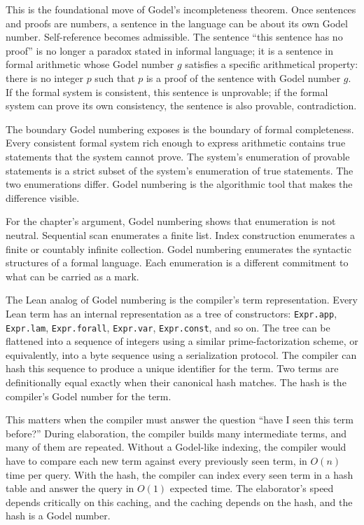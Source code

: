 This is the foundational move of Godel's incompleteness theorem. Once
sentences and proofs are numbers, a sentence in the language can be about its
own Godel number. Self-reference becomes admissible. The sentence ``this
sentence has no proof'' is no longer a paradox stated in informal language;
it is a sentence in formal arithmetic whose Godel number $g$ satisfies a
specific arithmetical property: there is no integer $p$ such that $p$ is a
proof of the sentence with Godel number $g$. If the formal system is
consistent, this sentence is unprovable; if the formal system can prove its
own consistency, the sentence is also provable, contradiction.

The boundary Godel numbering exposes is the boundary of formal completeness.
Every consistent formal system rich enough to express arithmetic contains
true statements that the system cannot prove. The system's enumeration of
provable statements is a strict subset of the system's enumeration of true
statements. The two enumerations differ. Godel numbering is the algorithmic
tool that makes the difference visible.

For the chapter's argument, Godel numbering shows that enumeration is not
neutral. Sequential scan enumerates a finite list. Index construction
enumerates a finite or countably infinite collection. Godel numbering
enumerates the syntactic structures of a formal language. Each enumeration
is a different commitment to what can be carried as a mark.

The Lean analog of Godel numbering is the compiler's term representation.
Every Lean term has an internal representation as a tree of constructors:
\texttt{Expr.app}, \texttt{Expr.lam}, \texttt{Expr.forall}, \texttt{Expr.var},
\texttt{Expr.const}, and so on. The tree can be flattened into a sequence of
integers using a similar prime-factorization scheme, or equivalently, into a
byte sequence using a serialization protocol. The compiler can hash this
sequence to produce a unique identifier for the term. Two terms are
definitionally equal exactly when their canonical hash matches. The hash is
the compiler's Godel number for the term.

This matters when the compiler must answer the question ``have I seen this
term before?'' During elaboration, the compiler builds many intermediate
terms, and many of them are repeated. Without a Godel-like indexing, the
compiler would have to compare each new term against every previously seen
term, in $O(n)$ time per query. With the hash, the compiler can index every
seen term in a hash table and answer the query in $O(1)$ expected time. The
elaborator's speed depends critically on this caching, and the caching
depends on the hash, and the hash is a Godel number.

